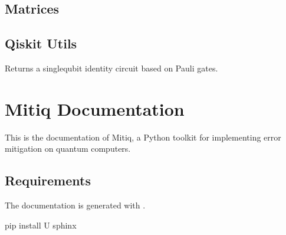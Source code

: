 \documentclass[letterpaper,10pt,english]{sphinxmanual}
\begin{document}
\section{Matrices}
\label{\detokenize{apidoc:module-mitiq.matrices}}\label{\detokenize{apidoc:matrices}}

\section{Qiskit Utils}
\label{\detokenize{apidoc:module-mitiq.qiskit.qiskit_utils}}\label{\detokenize{apidoc:qiskit-utils}}

\begin{fulllineitems}
\label{\detokenize{apidoc:mitiq.qiskit.qiskit_utils.random_identity_circuit}}
Returns a single\sphinxhyphen{}qubit identity circuit based on Pauli gates.

\end{fulllineitems}




\chapter{Mitiq Documentation}
\label{\detokenize{toc-README-docs:mitiq-documentation}}\label{\detokenize{toc-README-docs::doc}}
This is the documentation of Mitiq, a Python toolkit for
implementing error mitigation on quantum computers.


\section{Requirements}
\label{\detokenize{toc-README-docs:requirements}}
The documentation is generated with
.

\begin{sphinxVerbatim}[commandchars=\\\{\}]
pip install \PYGZhy{}U sphinx
\end{sphinxVerbatim}
\end{document}
